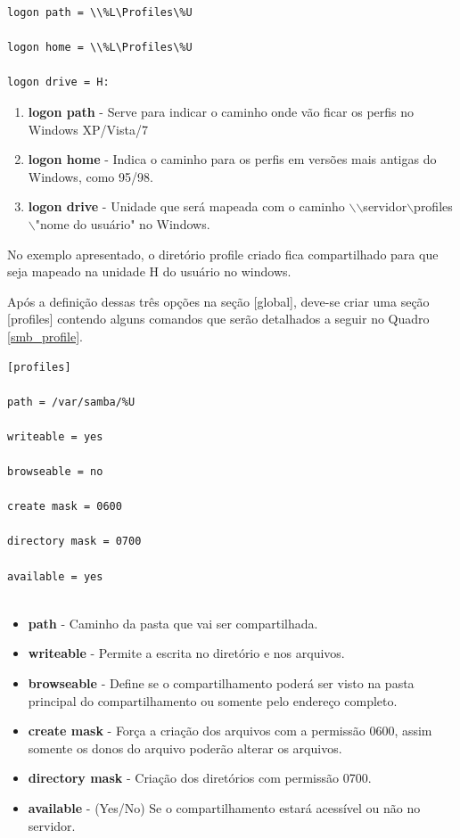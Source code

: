 \begin{lstlisting}[caption=Variáveis necessárias para o perfil móvel,label={logon_path}]	
logon path = \\%L\Profiles\%U

logon home = \\%L\Profiles\%U

logon drive = H:	
\end{lstlisting}


\begin{enumerate}
	\item \textbf{logon path} - Serve para indicar o caminho onde vão ficar os perfis no Windows XP/Vista/7 
	\item \textbf{logon home} - Indica o caminho para os perfis em versões mais antigas do Windows, como 95/98.
	\item \textbf{logon drive} -  Unidade que será mapeada com o caminho $\backslash$$\backslash$servidor$\backslash$profiles$\backslash$"nome do usuário" no Windows.
\end{enumerate}

No exemplo apresentado, o diretório profile criado fica compartilhado para que seja mapeado na unidade H do usuário no windows.

Após a definição dessas três opções na seção [global], deve-se criar uma seção [profiles] contendo alguns comandos que serão detalhados a seguir no Quadro \ref{smb_profile}.\\

\begin{lstlisting}[caption=Variáveis para criação do compartilhamento profile,label={smb_profile}]	
[profiles] 

path = /var/samba/%U 
	
writeable = yes 
	
browseable = no 
	
create mask = 0600 
	
directory mask = 0700 
	
available = yes
	
\end{lstlisting}

\begin{itemize}
	\item \textbf {path} - Caminho da pasta que vai ser compartilhada.
	\item \textbf {writeable} - Permite a escrita no diretório e nos arquivos.
	\item \textbf {browseable} - Define se o compartilhamento poderá ser visto na pasta principal do compartilhamento ou somente pelo endereço completo.
	\item \textbf {create mask} - Força a criação dos arquivos com a permissão 0600, assim somente os donos do arquivo poderão alterar os arquivos.
	\item \textbf {directory mask} - Criação dos diretórios com permissão 0700.
	\item \textbf{available} - (Yes/No) Se o compartilhamento estará acessível ou não no servidor.
\end{itemize}

